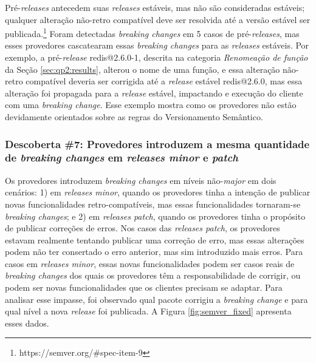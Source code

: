 Pré-\textit{releases} antecedem suas \textit{releases} estáveis, mas não são consideradas estáveis; qualquer alteração não-retro compatível deve ser resolvida até a versão estável ser publicada.\footnote{https://semver.org/\#spec-item-9} Foram detectadas \textit{breaking changes} em 5 casos de pré-\textit{releases}, mas esses provedores cascatearam essas \textit{breaking changes} para as \textit{releases} estáveis. Por exemplo, a pré-\textit{release} \textsf{redis@2.6.0-1}, descrita na categoria \textit{Renomeação de função} da Seção \ref{sec:qp2:results}, alterou o nome de uma função, e essa alteração não-retro compatível deveria ser corrigida até a \textit{release} estável \textsf{redis@2.6.0}, mas essa alteração foi propagada para a \textit{release} estável, impactando e execução do cliente com uma \textit{breaking change}. Esse exemplo mostra como os provedores não estão devidamente orientados sobre as regras do Versionamento Semântico.

\subsubsection{Descoberta \#7: Provedores introduzem a mesma quantidade de \textit{breaking changes} em \textit{releases minor} e \textit{patch}}

Os provedores introduzem \textit{breaking changes} em níveis não-\textit{major} em dois cenários: 1) em \textit{releases minor}, quando os provedores tinha a intenção de publicar novas funcionalidades retro-compatíveis, mas essas funcionalidades tornaram-se \textit{breaking changes}; e 2) em \textit{releases patch}, quando os provedores tinha o propósito de publicar correções de erros. Nos casos das \textit{releases patch}, os provedores estavam realmente tentando publicar uma correção de erro, mas essas alterações podem não ter consertado o erro anterior, mas sim introduzido mais erros. Para casos em \textit{releases minor}, essas novas funcionalidades podem ser casos reais de \textit{breaking changes} dos quais os provedores têm a responsabilidade de corrigir, ou podem ser novas funcionalidades que os clientes precisam se adaptar. Para analisar esse impasse, foi observado qual pacote corrigiu a \textit{breaking change} e para qual nível a nova \textit{release} foi publicada. A Figura \ref{fig:semver_fixed} apresenta esses dados.

